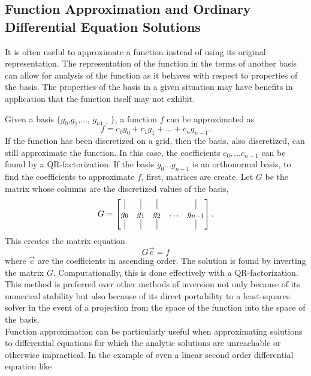 \documentclass[11pt]{amsart}
\begin{document}
\subsection{Function Approximation and Ordinary Differential Equation Solutions} 
 It is often useful to approximate a function instead of using its original representation. The representation of the function in the terms of another basis can allow for analysis of the function as it behaves with respect to properties of the basis. The properties of the basis in a given situation may have benefits in application that the function itself may not exhibit.  
 
 Given a basis $\{g_0$,$g_1$,$\ldots$, $g_{n1-}\}$, a function $f$ can be approximated as 
 \begin{equation*}
 f=c_0g_0+c_1g_1+\ldots+c_ng_{n-1}.
 \end{equation*}  
 If the function has been discretized on a grid, then the basis, also discretized, can still approximate the function.  In this case, the coefficients $c_0,\ldots c_{n-1}$ can be found by a QR-factorization. If the basis $g_0 \ldots g_{n-1}$ is an orthonormal basis, to find the coefficients to approximate $f$, first, matrices are create.  Let $G$ be the matrix whose columns are the discretized values of the basis, 
 \begin{equation*}
 G=\begin{bmatrix}
 \vline & \vline & \vline &  & \vline \\
 g_0 & g_1 & g_2 & \ldots & g_{n-1} \\
 \vline & \vline & \vline &  & \vline 
 \end{bmatrix}.
 \end{equation*}
 This creates the matrix equation
 \begin{equation}
 G\vec{c}=f
 \end{equation}
 where $\vec{c}$ are the coefficients in ascending order.  
 The solution is found by inverting the matrix $G$.  Computationally, this is done effectively with a QR-factorization.  This method is preferred over other methods of inversion not only because of its numerical stability but also because of its direct portability to a least-squares solver in the event of a projection from the space of the function into the space of the basis.  \\ 
 Function approximation can be particularly useful when approximating solutions to differential equations for which the analytic solutions are unreachable or otherwise impractical.  
 In the example of even a linear second order differential equation like
\end{document}
